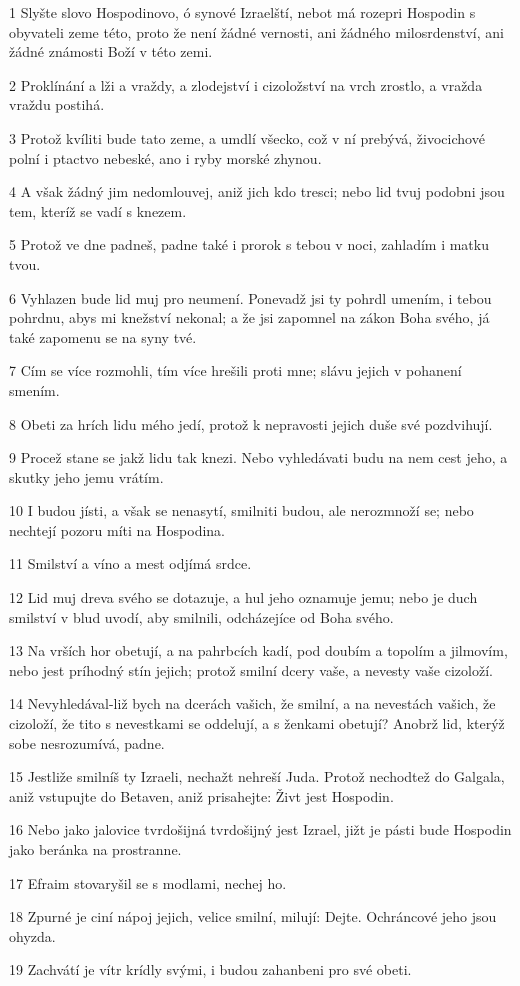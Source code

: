 \par 1 Slyšte slovo Hospodinovo, ó synové Izraelští, nebot má rozepri Hospodin s obyvateli zeme této, proto že není žádné vernosti, ani žádného milosrdenství, ani žádné známosti Boží v této zemi.
\par 2 Proklínání a lži a vraždy, a zlodejství i cizoložství na vrch zrostlo, a vražda vraždu postihá.
\par 3 Protož kvíliti bude tato zeme, a umdlí všecko, což v ní prebývá, živocichové polní i ptactvo nebeské, ano i ryby morské zhynou.
\par 4 A však žádný jim nedomlouvej, aniž jich kdo tresci; nebo lid tvuj podobni jsou tem, kteríž se vadí s knezem.
\par 5 Protož ve dne padneš, padne také i prorok s tebou v noci, zahladím i matku tvou.
\par 6 Vyhlazen bude lid muj pro neumení. Ponevadž jsi ty pohrdl umením, i tebou pohrdnu, abys mi knežství nekonal; a že jsi zapomnel na zákon Boha svého, já také zapomenu se na syny tvé.
\par 7 Cím se více rozmohli, tím více hrešili proti mne; slávu jejich v pohanení smením.
\par 8 Obeti za hrích lidu mého jedí, protož k nepravosti jejich duše své pozdvihují.
\par 9 Procež stane se jakž lidu tak knezi. Nebo vyhledávati budu na nem cest jeho, a skutky jeho jemu vrátím.
\par 10 I budou jísti, a však se nenasytí, smilniti budou, ale nerozmnoží se; nebo nechtejí pozoru míti na Hospodina.
\par 11 Smilství a víno a mest odjímá srdce.
\par 12 Lid muj dreva svého se dotazuje, a hul jeho oznamuje jemu; nebo je duch smilství v blud uvodí, aby smilnili, odcházejíce od Boha svého.
\par 13 Na vrších hor obetují, a na pahrbcích kadí, pod doubím a topolím a jilmovím, nebo jest príhodný stín jejich; protož smilní dcery vaše, a nevesty vaše cizoloží.
\par 14 Nevyhledával-liž bych na dcerách vašich, že smilní, a na nevestách vašich, že cizoloží, že tito s nevestkami se oddelují, a s ženkami obetují? Anobrž lid, kterýž sobe nesrozumívá, padne.
\par 15 Jestliže smilníš ty Izraeli, nechažt nehreší Juda. Protož nechodtež do Galgala, aniž vstupujte do Betaven, aniž prisahejte: Živt jest Hospodin.
\par 16 Nebo jako jalovice tvrdošijná tvrdošijný jest Izrael, jižt je pásti bude Hospodin jako beránka na prostranne.
\par 17 Efraim stovaryšil se s modlami, nechej ho.
\par 18 Zpurné je ciní nápoj jejich, velice smilní, milují: Dejte. Ochráncové jeho jsou ohyzda.
\par 19 Zachvátí je vítr krídly svými, i budou zahanbeni pro své obeti.

